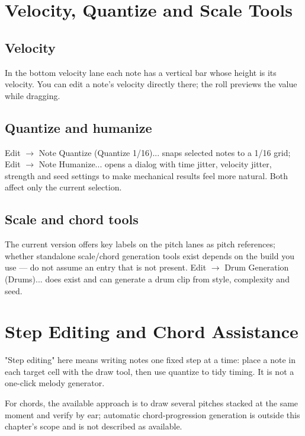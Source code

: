 \section{Velocity, Quantize and Scale Tools}

\subsection{Velocity}

In the bottom velocity lane each note has a vertical bar whose height is its velocity.
You can edit a note's velocity directly there; the roll previews the value while
dragging.

\subsection{Quantize and humanize}

Edit $\to$ Note Quantize (Quantize 1/16)... snaps selected notes to a 1/16 grid;
Edit $\to$ Note Humanize... opens a dialog with time jitter, velocity jitter, strength
and seed settings to make mechanical results feel more natural. Both affect only the
current selection.


\subsection{Scale and chord tools}

The current version offers key labels on the pitch lanes as pitch references; whether
standalone scale/chord generation tools exist depends on the build you use — do not
assume an entry that is not present. Edit $\to$ Drum Generation (Drums)... does exist
and can generate a drum clip from style, complexity and seed.

\section{Step Editing and Chord Assistance}

"Step editing" here means writing notes one fixed step at a time: place a note in each
target cell with the draw tool, then use quantize to tidy timing. It is not a
one-click melody generator.

For chords, the available approach is to draw several pitches stacked at the same
moment and verify by ear; automatic chord-progression generation is outside this
chapter's scope and is not described as available.

